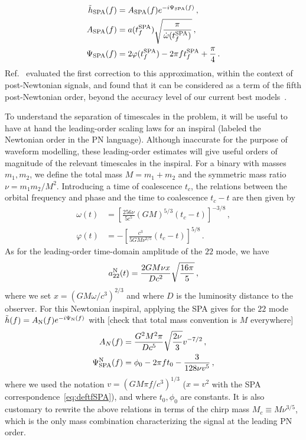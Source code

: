 \documentclass[aps,showpacs,twocolumn,
prd,superscriptaddress,nofootinbib]{revtex4-1}
\newcommand{\be}{\begin{equation}}
\newcommand{\ee}{\end{equation}}
\newcommand{\Mchirp}{M_{c}}
\newcommand{\tfSPA}{t_{f}^{\rm SPA}}
\newcommand{\SM}[1]{{\color{Red} #1}}
\begin{document}
\begin{subequations}
\begin{align}
	\tilde{h}_{\rm SPA}(f) &= A_{\rm SPA}(f) e^{-i\Psi_{\rm SPA}(f)} \,, \\
	A_{\rm SPA}(f) &= a(\tfSPA) \sqrt{\frac{\pi}{\dot{\omega}(\tfSPA)}} \,, \\
	\Psi_{\rm SPA}(f) &= 2\varphi(\tfSPA) - 2\pi f \tfSPA + \frac{\pi}{4} \,. \label{eq:PsiSPA}
\end{align}
\end{subequations}
Ref.~\cite{Droz+99} evaluated the first correction to this approximation, within the context of post-Newtonian signals, and found that it can be considered as a term of the fifth post-Newtonian order, beyond the accuracy level of our current best models~\cite{BlanchetLiving}.

To understand the separation of timescales in the problem, it will be useful to have at hand the leading-order scaling laws for an inspiral (labeled the Newtonian order in the PN language). Although inaccurate for the purpose of waveform modelling, these leading-order estimates will give useful orders of magnitude of the relevant timescales in the inspiral. For a binary with masses $m_{1}, m_{2}$, we define the total mass $M=m_{1}+m_{2}$ and the symmetric mass ratio $\nu = m_{1}m_{2}/M^{2}$. Introducing a time of coalescence $t_{c}$, the relations between the orbital frequency and phase and the time to coalescence $t_{c} - t$ are then given by
\begin{subequations}\label{eq:omegaphiN}
\begin{align}
	\omega(t) &= \left[ \frac{256\nu}{5c^{5}} (GM)^{5/3} (t_{c}-t) \right]^{-3/8} \,, \\
	\varphi(t) &= -\left[ \frac{c^{3}}{5 G M \nu^{3/5}} (t_{c}-t) \right]^{5/8} \,.
\end{align}
\end{subequations}
As for the leading-order time-domain amplitude of the $22$ mode, we have~\cite{BlanchetLiving}
\be\label{eq:a22N}
	a_{22}^{\rm N} (t) = \frac{2 G M \nu x}{D c^{2}} \sqrt{\frac{16 \pi}{5}} \,,
\ee
where we set $x = (G M\omega/c^{3})^{2/3}$ and where $D$ is the luminosity distance to the observer. For this Newtonian inspiral, applying the SPA gives for the $22$ mode $\tilde{h}(f) = A_{\rm N}(f)e^{-i\Psi_{\rm N}(f)}$ with \SM{[check that total mass convention is $M$ everywhere]}
\begin{subequations}\label{eq:SPAN}
\begin{align}
	A_{N}(f) &= \frac{G^{2}M^{2} \pi}{Dc^{5}} \sqrt{\frac{2\nu}{3}} v^{-7/2}\,, \label{eq:ASPAN}\\
	\Psi_{\rm SPA}^{\rm N}(f) &= \phi_{0} - 2\pi f t_{0} - \frac{3}{128\nu v^{5}} \,, \label{eq:PsiSPAN} 
\end{align}
\end{subequations}
where we used the notation $v=(G M \pi f/c^{3})^{1/3}$ ($x=v^{2}$ with the SPA correspondence~\eqref{eq:deftfSPA}), and where $t_{0}, \phi_{0}$ are constants. It is also customary to rewrite the above relations in terms of the chirp mass $\Mchirp \equiv M\nu^{3/5}$, which is the only mass combination characterizing the signal at the leading PN order.
\end{document}

